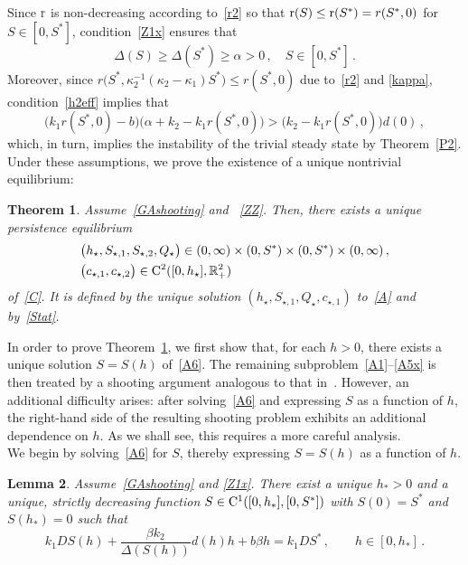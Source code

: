 \documentclass[reqno,11pt]{amsart}
\newtheorem{thm}{Theorem}[section]
\newtheorem{lem}[thm]{Lemma}
\numberwithin{equation}{section}
\newcommand{\R}{\mathbb{R}}
\begin{document}
 Since ${\rm r}$ is non-decreasing according to~\eqref{r2} so that ${\rm r}(S)\le{\rm r}(S^*)=r(S^*,0)$ for $S\in[0,S^*]$, condition~\eqref{Z1x} ensures that
$$
\Delta(S)\ge\Delta(S^*)\ge\alpha>0\,,\quad S\in[0,S^*]\,.
$$
Moreover, since $ r\big(S^*,\kappa_2^{-1}(\kappa_2-\kappa_1)S^*\big)\le r(S^*,0)$ due to~\eqref{r2} and \eqref{kappa}, condition~\eqref{h2eff} implies that
\begin{equation*}
\big(k_1 r(S^*,0)-b\big)\big(\alpha+k_2-k_1 r(S^*,0)\big)>\big(k_2-k_1 r(S^*,0)\big)d(0)\,,
\end{equation*}
which, in turn, implies the instability of the trivial steady state by Theorem~\ref{P2}. Under these assumptions, we prove the existence of a unique nontrivial equilibrium:


\begin{thm}\label{T5}
Assume~\eqref{GAshooting} and ~\eqref{ZZ}. Then, there exists a unique persistence equilibrium
\begin{align*}
&\big(h_\star,S_{\star,1},S_{\star,2},Q_\star\big) \in (0,\infty)\times (0,S^*)\times (0,S^*)\times (0,\infty)\,,\\
& \big(c_{\star,1},c_{\star,2}\big)\in {\rm C}^2([0,h_\star],\R_+^2)
\end{align*}
of~\eqref{C}. It is defined by the unique solution
$(h_\star,S_{\star,1},Q_\star, c_{\star,1})$
to~\eqref{A} and by~\eqref{Stat}.
\end{thm}

In order to prove Theorem~\ref{T5}, we first show that, for each $h>0$, there exists a unique solution $S=S(h)$ of~\eqref{A6}. The remaining subproblem~\eqref{A1}--\eqref{A5x} is then treated by a shooting argument analogous to that in~\cite{NW26}. However, an additional difficulty arises: after solving~\eqref{A6} and expressing $S$ as a function of $h$, the right-hand side of the resulting shooting problem exhibits an additional dependence on $h$. As we shall see, this requires a more careful analysis.
\\



We begin by solving~\eqref{A6} for $S$, thereby expressing $S=S(h)$ as a function of $h$.


\begin{lem}\label{L20}
 Assume~\eqref{GAshooting} and \eqref{Z1x}.
There exist a unique $h_*>0$ and a unique, strictly decreasing function $S\in {\rm C}^1([0,h_*], [0,S^*])$ with $S(0)=S^*$ and $S(h_*)=0$ such that 
\begin{equation}\label{A6y}
k_1DS(h)+\frac{\beta k_2}{\Delta(S(h))} d(h)h+b\beta h=k_1D S^*\,,\qquad h\in [0,h_*]\,.
\end{equation}
\end{lem}
\end{document}

